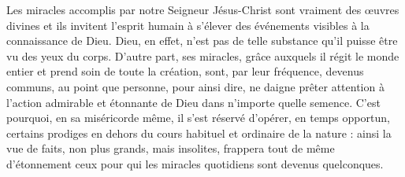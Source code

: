 Les miracles accomplis par notre Seigneur Jésus-Christ sont vraiment des œuvres divines et ils invitent l’esprit humain à s’élever des événements visibles à la connaissance de Dieu. Dieu, en effet, n’est pas de telle substance qu’il puisse être vu des yeux du corps. D’autre part, ses miracles, grâce auxquels il régit le monde entier et prend soin de toute la création, sont, par leur fréquence, devenus communs, au point que personne, pour ainsi dire, ne daigne prêter attention à l’action admirable et étonnante de Dieu dans n’importe quelle semence. C’est pourquoi, en sa miséricorde même, il s’est réservé d’opérer, en temps opportun, certains prodiges en dehors du cours habituel et ordinaire de la nature : ainsi la vue de faits, non plus grands, mais insolites, frappera tout de même d’étonnement ceux pour qui les miracles quotidiens sont devenus quelconques.
